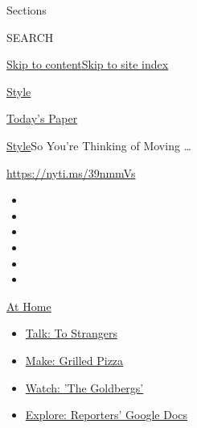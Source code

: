 Sections

SEARCH

\protect\hyperlink{site-content}{Skip to
content}\protect\hyperlink{site-index}{Skip to site index}

\href{https://www.nytimes3xbfgragh.onion/section/style}{Style}

\href{https://myaccount.nytimes3xbfgragh.onion/auth/login?response_type=cookie\&client_id=vi}{}

\href{https://www.nytimes3xbfgragh.onion/section/todayspaper}{Today's
Paper}

\href{/section/style}{Style}\textbar{}So You're Thinking of Moving
\ldots{}

\url{https://nyti.ms/39nmmVs}

\begin{itemize}
\item
\item
\item
\item
\item
\item
\end{itemize}

\href{https://www.nytimes3xbfgragh.onion/spotlight/at-home?action=click\&pgtype=Article\&state=default\&region=TOP_BANNER\&context=at_home_menu}{At
Home}

\begin{itemize}
\tightlist
\item
  \href{https://www.nytimes3xbfgragh.onion/2020/08/03/well/family/the-benefits-of-talking-to-strangers.html?action=click\&pgtype=Article\&state=default\&region=TOP_BANNER\&context=at_home_menu}{Talk:
  To Strangers}
\item
  \href{https://www.nytimes3xbfgragh.onion/2020/08/01/at-home/coronavirus-make-pizza-on-a-grill.html?action=click\&pgtype=Article\&state=default\&region=TOP_BANNER\&context=at_home_menu}{Make:
  Grilled Pizza}
\item
  \href{https://www.nytimes3xbfgragh.onion/2020/07/31/arts/television/goldbergs-abc-stream.html?action=click\&pgtype=Article\&state=default\&region=TOP_BANNER\&context=at_home_menu}{Watch:
  'The Goldbergs'}
\item
  \href{https://www.nytimes3xbfgragh.onion/interactive/2020/at-home/even-more-reporters-editors-diaries-lists-recommendations.html?action=click\&pgtype=Article\&state=default\&region=TOP_BANNER\&context=at_home_menu}{Explore:
  Reporters' Google Docs}
\end{itemize}

